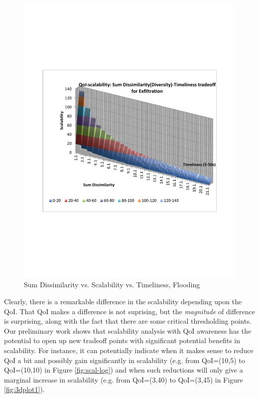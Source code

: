 \begin{figure}
    \includegraphics[scale=0.35]{figures/span_fld.pdf}
    \caption{Sum Dissimilarity vs. Scalability vs. Timeliness, Flooding}
    \label{fig:3dplot4}
\end{figure}

Clearly, there is a remarkable difference in the scalability depending upon
the QoI.%
That QoI makes a difference is not suprising, but the {\em magnitude} of
difference is surprising, along with the fact that there are some critical
thresholding points. Our preliminary work shows that
scalability analysis with QoI awareness has the potential to
open up new tradeoff points with
significant potential benefits in scalability. For instance, it can
potentially indicate when it makes sense to reduce QoI a bit and possibly
gain significantly in scalability (e.g. from QoI=(10,5) to QoI=(10,10) in Figure
\ref{fig:scal-log}) and when such reductions will only give a marginal
increase in scalability
(e.g. from QoI=(3,40) to QoI=(3,45) in Figure \ref{fig:3dplot1}).



